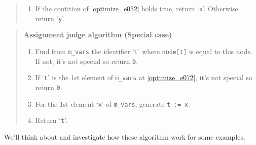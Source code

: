\begin{quote}
\begin{enumerate}
\begin{enumerate}
\item If {\tt{node[x]}} is not equal to this node, 
      not generate assignment.
\item \label{optimize_e053} 
      If `{\tt{x}}' is alive in an exit of this basic block,
      generate {\tt{x := y}}.
\item \label{optimize_e110} 
      If there exists a 3 address code {\tt{p := \&x}} in this
      basic block, generate {\tt{x := y}}
      (\ref{optimize_e111} distinguishes this and \ref{optimize_e052}).
\item If `{\tt{x}}' is used before it is defined, 
      generate {\tt{x := y}}.
\end{enumerate}

\item \label{optimize_e111}
If the contition of \ref{optimize_e052} holds true,
      return `{\tt{x}}'. Otherwise return `{\tt{y}}'. 
\end{enumerate}
\end{quote}

\begin{quote}
{\bf Assignment judge algorithm (Special case) }
\begin{enumerate}
\item \label{optimize_e072}
      Find from {\tt{m\_vars}} the identifier `{\tt{t}}' where
      {\tt{node[t]}} is equal to this node. If not, it's not special so
      return {\tt{0}}.
\item If `{\tt{t}}' is the 1st element of {\tt{m\_vars}} at
      \ref{optimize_e072}, it's not special so return {\tt{0}}.

\item For the 1st element `{\tt{x}}' of {\tt{m\_vars}},
      generate {\tt{t := x}}.

\item Return `{\tt{t}}'.
\end{enumerate}
\end{quote}

We'll think about and investigate how these algorithm work for some examples.

